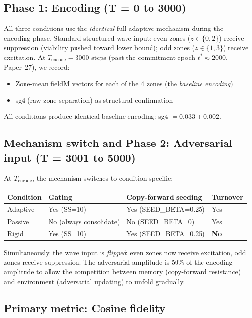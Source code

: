 \documentclass[11pt]{article}
\begin{document}
\subsection{Phase 1: Encoding (T = 0 to 3000)}

All three conditions use the \emph{identical} full adaptive mechanism
during the encoding phase.
Standard structured wave input: even zones ($z \in \{0,2\}$) receive suppression
(viability pushed toward lower bound); odd zones ($z \in \{1,3\}$) receive excitation.
At $T_\mathrm{encode} = 3000$ steps (past the commitment epoch $t^* \approx 2000$,
Paper~27), we record:
\begin{itemize}[itemsep=1pt]
  \item Zone-mean fieldM vectors for each of the 4 zones (the \emph{baseline encoding})
  \item sg4 (raw zone separation) as structural confirmation
\end{itemize}
All conditions produce identical baseline encoding: sg4 $= 0.033 \pm 0.002$.

\subsection{Mechanism switch and Phase 2: Adversarial input (T = 3001 to 5000)}

At $T_\mathrm{encode}$, the mechanism switches to condition-specific:

\begin{center}
\begin{tabular}{llll}
\toprule
Condition & Gating & Copy-forward seeding & Turnover \\
\midrule
Adaptive & Yes (SS=10) & Yes (SEED\_BETA=0.25) & Yes \\
Passive  & No (always consolidate) & No (SEED\_BETA=0)    & Yes \\
Rigid    & Yes (SS=10) & Yes (SEED\_BETA=0.25) & \textbf{No} \\
\bottomrule
\end{tabular}
\end{center}

Simultaneously, the wave input is \emph{flipped}: even zones now receive excitation,
odd zones receive suppression.
The adversarial amplitude is 50\% of the encoding amplitude to allow the competition
between memory (copy-forward resistance) and environment (adversarial updating) to
unfold gradually.

\subsection{Primary metric: Cosine fidelity}
\end{document}

